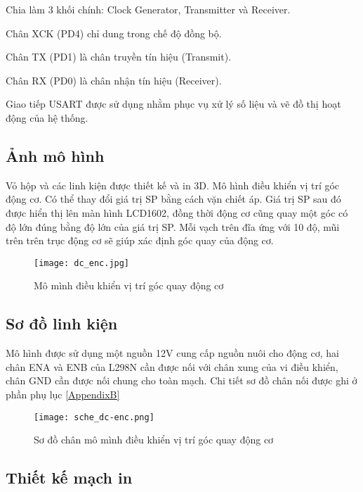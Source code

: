 Chia làm 3 khối chính: Clock Generator, Transmitter và Receiver.

Chân XCK (PD4) chỉ dung trong chế độ đồng bộ.

Chân TX (PD1) là chân truyền tín hiệu (Transmit).

Chân RX (PD0) là chân nhận tín hiệu (Receiver).

Giao tiếp USART được sử dụng nhằm phục vụ xử lý số liệu và vẽ đồ thị hoạt động của hệ thống.


\subsection{Ảnh mô hình}

Vỏ hộp và các linh kiện được thiết kế và in 3D. Mô hình điều khiển vị trí góc động cơ. Có thể thay đổi giá trị SP bằng cách vặn chiết áp. Giá trị SP sau đó được hiển thị lên màn hình LCD1602, đồng thời động cơ cũng quay một góc có độ lớn đúng bằng độ lớn của giá trị SP. Mỗi vạch trên đĩa ứng với 10 độ, mũi trên trên trục động cơ sẽ giúp xác định góc quay của động cơ. 

\begin{figure}[h!]
	\centering
	\texttt{[image: dc\_enc.jpg]}
	\caption[Mô mình điều khiển vị trí góc quay động cơ]{Mô mình điều khiển vị trí góc quay động cơ}
	\label{fig:Mô mình điều khiển vị trí góc quay động cơ}
\end{figure}
\newpage
\subsection{Sơ đồ linh kiện}

Mô hình được sử dụng một nguồn 12V cung cấp nguồn nuôi cho động cơ, hai chân ENA và ENB của L298N cần được nối với chân xung của vi điều khiển, chân GND cần được nối chung cho toàn mạch. Chi tiết sơ đồ chân nối được ghi ở phần phụ lục \ref{AppendixB}

\begin{figure}[h!]
	\centering
	\texttt{[image: sche\_dc-enc.png]}
	\caption[Sơ đồ chân mô mình điều khiển vị trí góc quay động cơ]{Sơ đồ chân mô mình điều khiển vị trí góc quay động cơ}
	\label{fig:Sơ đồ chân mô mình điều khiển vị trí góc quay động cơ}
\end{figure}
\newpage
\subsection{Thiết kế mạch in}

